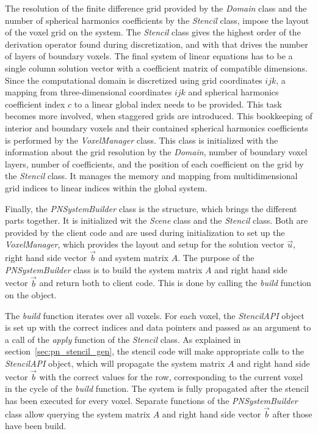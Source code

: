 The resolution of the finite difference grid provided by the \emph{Domain} class and the number of spherical harmonics coefficients by the \emph{Stencil} class, impose the layout of the voxel grid on the system. The \emph{Stencil} class gives the highest order of the derivation operator found during discretization, and with that drives the number of layers of boundary voxels. The final system of linear equations has to be a single column solution vector with a coefficient matrix of compatible dimensions. Since the computational domain is discretized using grid coordinates $ijk$, a mapping from three-dimensional coordinates $ijk$ and spherical harmonics coefficient index $c$ to a linear global index needs to be provided. This task becomes more involved, when staggered grids are introduced. This bookkeeping of interior and boundary voxels and their contained spherical harmonics coefficients is performed by the \emph{VoxelManager} class. This class is initialized with the information about the grid resolution by the \emph{Domain}, number of boundary voxel layers, number of coefficients, and the position of each coefficient on the grid by the \emph{Stencil} class. It manages the memory and mapping from multidimensional grid indices to linear indices within the global system.

Finally, the \emph{PNSystemBuilder} class is the structure, which brings the different parts together. It is initialized wit the \emph{Scene} class and the \emph{Stencil} class. Both are provided by the client code and are used during initialization to set up the \emph{VoxelManager}, which provides the layout and setup for the solution vector $\vec{u}$, right hand side vector $\vec{b}$ and system matrix $A$. The purpose of the \emph{PNSystemBuilder} class is to build the system matrix $A$ and right hand side vector $\vec{b}$ and return both to client code. This is done by calling the \emph{build} function on the object.

The \emph{build} function iterates over all voxels. For each voxel, the \emph{StencilAPI} object is set up with the correct indices and data pointers and passed as an argument to a call of the \emph{apply} function of the \emph{Stencil} class. As explained in section~\ref{sec:pn_stencil_gen}, the stencil code will make appropriate calls to the \emph{StencilAPI} object, which will propagate the system matrix $A$ and right hand side vector $\vec{b}$ with the correct values for the row, corresponding to the current voxel in the cycle of the \emph{build} function. The system is fully propagated after the stencil has been executed for every voxel. Separate functions of the \emph{PNSystemBuilder} class allow querying the system matrix $A$ and right hand side vector $\vec{b}$ after those have been build.

